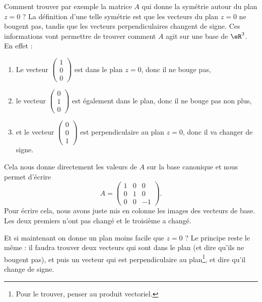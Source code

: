 Comment trouver par exemple la matrice \( A\) qui donne la symétrie autour du plan \( z=0\) ? La définition d'une telle symétrie est que les vecteurs du plan \( z=0\) ne bougent pas, tandis que les vecteurs perpendiculaires changent de signe. Ces informations vont permettre de trouver comment \( A\) agit sur une base de \( \eR^3\). En effet :
\begin{enumerate}

	\item
	      Le vecteur \( \begin{pmatrix}
		      1 \\
		      0 \\
		      0
	      \end{pmatrix}\) est dans le plan \( z=0\), donc il ne bouge pas,

	\item
	      le vecteur \( \begin{pmatrix}
		      0 \\
		      1 \\
		      0
	      \end{pmatrix}\) est également dans le plan, donc il ne bouge pas non plus,

	\item
	      et le vecteur \( \begin{pmatrix}
		      0 \\
		      0 \\
		      1
	      \end{pmatrix}\) est perpendiculaire au plan \( z=0\), donc il va changer de signe.

\end{enumerate}
Cela nous donne directement les valeurs de \( A\) sur la base canonique et nous permet d'écrire
\begin{equation}
	A=\begin{pmatrix}
		1 & 0 & 0  \\
		0 & 1 & 0  \\
		0 & 0 & -1
	\end{pmatrix}.
\end{equation}
Pour écrire cela, nous avons juste mis en colonne les images des vecteurs de base. Les deux premiers n'ont pas changé et le troisième a changé.

Et si maintenant on donne un plan moins facile que \( z=0\) ? Le principe reste le même : il faudra trouver deux vecteurs qui sont dans le plan (et dire qu'ils ne bougent pas), et puis un vecteur qui est perpendiculaire au plan\footnote{Pour le trouver, penser au produit vectoriel.}, et dire qu'il change de signe.

